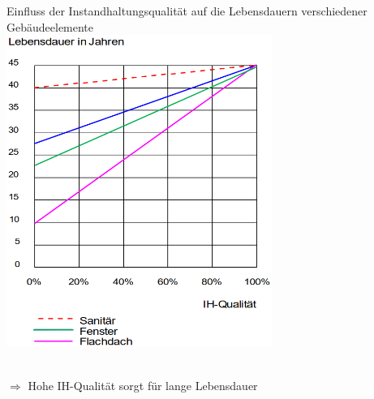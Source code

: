 \documentclass[fleqn,twoside,dvipsnames]{article}
\begin{document}
\begin{itemize}
\begin{minipage}{0.4\textwidth}
                    \end{minipage}\hspace{2mm}
                    \begin{minipage}{0.52\textwidth} 
                        Einfluss der Instandhaltungsqualität auf die Lebensdauern verschiedener Gebäudeelemente\\
                        \includegraphics[width=0.65\textwidth]{Grafiken/Lebensdauer und Abnutzung von Bauteilen/Einfluss IH Qualitaet 2.png}
                    \end{minipage}\\ \vspace{2mm}
                    $\Rightarrow$ Hohe IH-Qualität sorgt für lange Lebensdauer
        \end{itemize}
\end{document}
